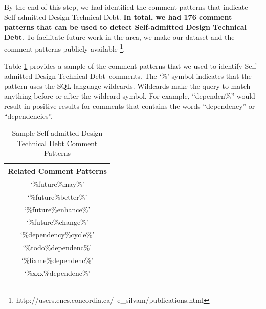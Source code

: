 \documentclass[conference]{IEEEtran}
\newcommand{\SADTD}{Self-admitted Design Technical Debt\xspace}
\begin{document}

By the end of this step, we had identified the comment patterns that indicate \SADTD. \textbf{In total, we had 176 comment patterns that can be used to detect \SADTD}. To facilitate future work in the area, we make our dataset and the comment patterns publicly available \footnote{http://users.encs.concordia.ca/~e\_silvam/publications.html}. 

Table \ref{tab:dictionarySample} provides a sample of the comment patterns that we used to identify \SADTD~comments. 
The `\%' symbol indicates that the pattern uses the SQL language wildcards. Wildcards make the query to match anything before or after the wildcard symbol. For example, ``dependen\%'' would result in positive results for comments that contains the words ``dependency'' or ``dependencies''.

\begin{table}[t!]
	\begin{center}
		\caption{Sample \SADTD Comment Patterns}
		\vspace{-2mm}
		\label{tab:dictionarySample}
		\begin{tabular}{ c }
			\toprule
			\textbf{Related Comment Patterns} \\ 
			\midrule
			     `\%future\%may\%'       \\
			     `\%future\%better\%'  \\
			     `\%future\%enhance\%' \\ 
			     `\%future\%change\%'  \\  	
			 `\%dependency\%cycle\%'  \\
			 `\%todo\%dependenc\%'    \\
			 `\%fixme\%dependenc\%'   \\
			 `\%xxx\%dependenc\%'    \\
			\bottomrule		 		
		\end{tabular}
	\end{center}	
\end{table}
\end{document}
